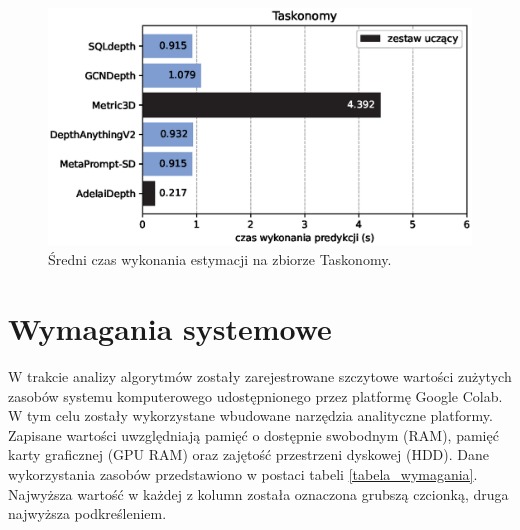 \begin{figure}[H]
    \centering
    \includegraphics{plots/exec_time/7}
    \caption{Średni czas wykonania estymacji na zbiorze Taskonomy.}
    \label{fig:exec_time_7}
\end{figure}

\section{Wymagania systemowe}
W trakcie analizy algorytmów zostały zarejestrowane szczytowe wartości zużytych zasobów systemu komputerowego udostępnionego przez platformę Google Colab. W tym celu zostały wykorzystane wbudowane narzędzia analityczne platformy. Zapisane wartości uwzględniają pamięć o dostępnie swobodnym (RAM), pamięć karty graficznej (GPU RAM) oraz zajętość przestrzeni dyskowej (HDD). Dane wykorzystania zasobów przedstawiono w postaci tabeli \ref{tabela_wymagania}. Najwyższa wartość w każdej z kolumn została oznaczona grubszą czcionką, druga najwyższa podkreśleniem.

\begin{table}[H]
    \centering
    \caption{Wykorzystane przez algorytmy zasoby komputerowe.}
    \vspace{0.1cm}
    \label{tabela_wymagania}
\end{table}

